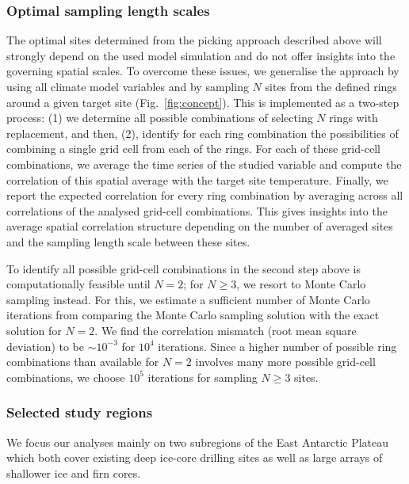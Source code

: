 \documentclass[cp, manuscript]{copernicus}
\begin{document}
\subsubsection{Optimal sampling length scales}\label{methods:opt.sampling}

The optimal sites determined from the picking approach described above will
strongly depend on the used model simulation and do not offer insights into the
governing spatial scales. To overcome these issues, we generalise the approach
by using all climate model variables and by sampling $N$ sites from the defined
rings around a given target site (Fig.~\ref{fig:concept}). This is implemented
as a two-step process: (1) we determine all possible combinations of selecting
$N$ rings with replacement, and then, (2), identify for each ring combination
the possibilities of combining a single grid cell from each of the rings. For
each of these grid-cell combinations, we average the time series of the studied
variable and compute the correlation of this spatial average with the target
site temperature. Finally, we report the expected correlation for every ring
combination by averaging across all correlations of the analysed grid-cell
combinations. This gives insights into the average spatial correlation structure
depending on the number of averaged sites and the sampling length scale between
these sites.

To identify all possible grid-cell combinations in the second step above is
computationally feasible until $N=2$; for $N\geq3$, we resort to Monte Carlo
sampling instead. For this, we estimate a sufficient number of Monte Carlo
iterations from comparing the Monte Carlo sampling solution with the exact
solution for $N=2$. We find the correlation mismatch (root mean square
deviation) to be $\sim10^{-3}$ for $10^4$ iterations. Since a higher number of
possible ring combinations than available for $N=2$ involves many more possible
grid-cell combinations, we choose $10^5$ iterations for sampling $N\geq3$ sites.

\subsubsection{Selected study regions}\label{methods:regions}

We focus our analyses mainly on two subregions of the East Antarctic Plateau
which both cover existing deep ice-core drilling sites as well as large arrays
of shallower ice and firn cores.
\end{document}
